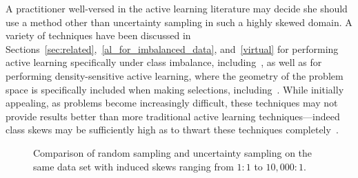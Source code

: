 

A practitioner well-versed in the active learning literature may decide she should use a method other than uncertainty sampling in such a highly skewed domain.  A variety of techniques have been discussed in Sections~\ref{sec:related},~\ref{al_for_imbalanced_data}, and~\ref{virtual} for performing active learning specifically under class imbalance, including~\cite{tomanek2009imbalance, bloodgood2009imbalance, zhu2007imbalance, Ertekin2_2007, he2007rarecategory}, as well as for performing density-sensitive active learning, where the geometry of the problem space is specifically included when making selections, including~\cite{zhuDensity2008, donmez2008psd, nguyen2004preclustering, xu03representitive, cmccallum98em}. While initially appealing, as problems become increasingly difficult, these techniques may not provide results better than more traditional active learning techniques---indeed class skews may be sufficiently high as to thwart these techniques completely~\cite{attprovkdd2010}.

\begin{figure}[t!]
\caption{Comparison of random sampling and uncertainty sampling on the same data set with induced skews ranging from $1:1$ to $10,000:1$.}
\label{fig:vary_skew}
\end{figure}

